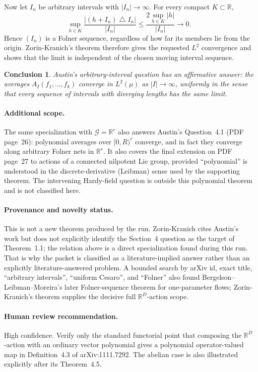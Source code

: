 \documentclass[11pt]{article}
\newtheorem*{conclusion}{Conclusion}
\begin{document}
Now let $I_n$ be arbitrary intervals with $|I_n|\to\infty$.  For every compact
$K\subset\mathbb R$,
\[
 \sup_{h\in K}\frac{|(h+I_n)\mathbin{\triangle}I_n|}{|I_n|}
 \leq \frac{2\sup_{h\in K}|h|}{|I_n|}\longrightarrow 0.
\]
Hence $(I_n)$ is a Folner sequence, regardless of how far its members lie from
the origin.  Zorin-Kranich's theorem therefore gives the requested $L^2$
convergence and shows that the limit is independent of the chosen moving
interval sequence.

\begin{conclusion}
Austin's arbitrary-interval question has an affirmative answer: the averages
$A_I(f_1,\ldots,f_k)$ converge in $L^2(\mu)$ as $|I|\to\infty$, uniformly in
the sense that every sequence of intervals with diverging lengths has the same
limit.
\end{conclusion}

\paragraph{Additional scope.}
The same specialization with $\mathcal G=\mathbb R^r$ also answers Austin's
Question~4.1 (PDF page~26): polynomial averages over $[0,R)^r$ converge, and in
fact they converge along arbitrary Folner nets in $\mathbb R^r$.  It also
covers the final extension on PDF page~27 to actions of a connected nilpotent
Lie group, provided ``polynomial'' is understood in the discrete-derivative
(Leibman) sense used by the supporting theorem.  The intervening Hardy-field
question is outside this polynomial theorem and is not classified here.

\paragraph{Provenance and novelty status.}
This is not a new theorem produced by the run.  Zorin-Kranich cites Austin's
work but does not explicitly identify the Section~4 question as the target of
Theorem~1.1; the relation above is a direct specialization found during this
run.  That is why the packet is classified as a literature-implied answer
rather than an explicitly literature-answered problem.  A bounded search by
arXiv id, exact title, ``arbitrary intervals'', ``uniform Cesaro'', and
``Folner'' also found Bergelson--Leibman--Moreira's later Folner-sequence
theorem for one-parameter flows; Zorin-Kranich's theorem supplies the decisive
full $\mathbb R^D$-action scope.

\paragraph{Human review recommendation.}
High confidence.  Verify only the standard functorial point that composing the
$\mathbb R^D$-action with an ordinary vector polynomial gives a polynomial
operator-valued map in Definition~4.3 of arXiv:1111.7292.  The abelian case is
also illustrated explicitly after its Theorem~4.5.
\end{document}
